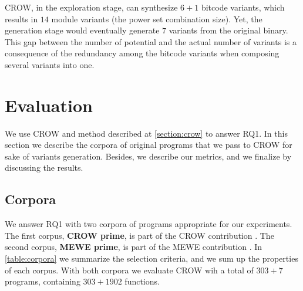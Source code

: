 
CROW, in the exploration stage, can synthesize $6 + 1$ bitcode variants, which results in $14$ module variants (the power set combination size). Yet, the generation stage would eventually generate $7$ variants from the original \wasm binary. This gap between the number of potential and the actual number of variants is a consequence of the redundancy among the bitcode variants when composing several variants into one. 

\section{Evaluation}
\label{section:crow:exp_setup}

We use CROW and method described at \autoref{section:crow} to answer RQ1. In this section we describe the corpora of original programs that we pass to CROW for sake of variants generation. Besides, we describe our metrics, and we finalize by discussing the results.

\subsection{Corpora}
\label{section:crow:corpora}

We answer RQ1 with two corpora of programs appropriate for our experiments. The first corpus, \textbf{CROW prime}, is part of the CROW contribution \cite{}. The second corpus, \textbf{MEWE prime}, is part of the MEWE contribution \cite{}. In \autoref{table:corpora} we summarize the selection criteria, and we sum up the properties of each corpus. With both corpora we evaluate CROW wih a total of $303 + 7$ programs, containing $303 + 1902$ functions.

